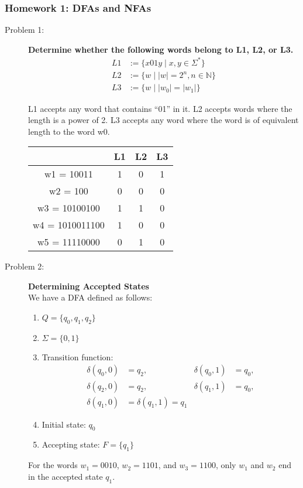 \documentclass{article}
\theoremstyle{theorem}
\theoremstyle{definition}
\theoremstyle{remark}
\begin{document}
\subsubsection{Homework 1: DFAs and NFAs}
\begin{description}
    \item[Problem 1:] \textbf{Determine whether the following words belong to L1, L2, or L3.}\\
    \begin{align*}
    L1 &:= \{x01y \mid x, y \in \Sigma^*\}\\
    L2 &:= \{w \mid |w| = 2^n, n \in \mathbb{N}\}\\
    L3 &:= \{w \mid |w_0| = |w_1|\}
    \end{align*}
    
    L1 accepts any word that contains ``01'' in it. L2 accepts words where the length is a power of 2. L3 accepts any word where the word is of equivalent length to the word w0.

    \begin{center}
    \begin{tabular}{||c c c c||} 
     \hline
       & L1 & L2 & L3 \\ [0.5ex] 
     \hline\hline
     w1 = 10011 & 1 & 0 & 1 \\
     \hline
     w2 = 100 & 0 & 0 & 0 \\
     \hline
     w3 = 10100100 & 1 & 1 & 0 \\
     \hline
     w4 = 1010011100 & 1 & 0 & 0 \\
     \hline
     w5 = 11110000 & 0 & 1 & 0 \\ [1ex] 
     \hline
    \end{tabular}
    \end{center}

    \item[Problem 2:] \textbf{Determining Accepted States}\\
    We have a DFA defined as follows:
    \begin{enumerate}
        \item $Q=\{q_0,q_1,q_2\}$
        \item $\Sigma=\{0,1\}$
        \item Transition function:
        \begin{align*}
        \delta(q_0,0) &= q_2, &\delta(q_0,1) &= q_0,\\
        \delta(q_2,0) &= q_2, &\delta(q_1,1) &= q_0,\\
        \delta(q_1,0) &= \delta(q_1,1) = q_1
        \end{align*}
        \item Initial state: $q_0$
        \item Accepting state: $F=\{q_1\}$
    \end{enumerate}
    For the words $w_1 = 0010$, $w_2 = 1101$, and $w_3 = 1100$, only $w_1$ and $w_2$ end in the accepted state $q_1$.
\end{description}
\end{document}
